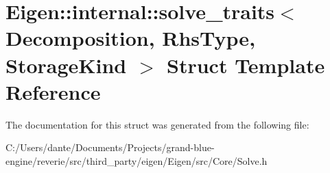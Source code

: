 \hypertarget{struct_eigen_1_1internal_1_1solve__traits}{}\section{Eigen\+::internal\+::solve\+\_\+traits$<$ Decomposition, Rhs\+Type, Storage\+Kind $>$ Struct Template Reference}
\label{struct_eigen_1_1internal_1_1solve__traits}


The documentation for this struct was generated from the following file\+:\begin{DoxyCompactItemize}
\item 
C\+:/\+Users/dante/\+Documents/\+Projects/grand-\/blue-\/engine/reverie/src/third\+\_\+party/eigen/\+Eigen/src/\+Core/Solve.\+h\end{DoxyCompactItemize}
